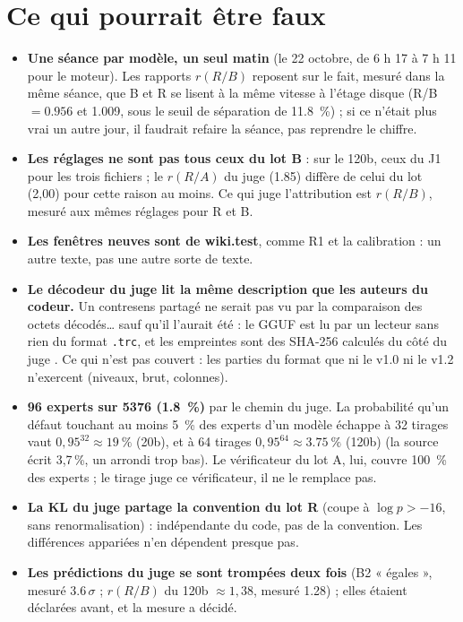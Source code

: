\section{Ce qui pourrait être faux}\label{t3jug:sec:faux}

\begin{faux}
\begin{itemize}
\item \textbf{Une séance par modèle, un seul matin} (le 22 octobre, de 6 h 17 à 7 h 11 pour le moteur). Les rapports $r(R/B)$ reposent sur le fait, mesuré dans la même séance, que B et R se lisent à la même vitesse à l'étage disque (R/B $= \num{0.956}$ et \num{1.009}, sous le seuil de séparation de \SI{11.8}{\percent}) ; si ce n'était plus vrai un autre jour, il faudrait refaire la séance, pas reprendre le chiffre.
\item \textbf{Les réglages ne sont pas tous ceux du lot B} : sur le 120b, ceux du J1 pour les trois fichiers ; le $r(R/A)$ du juge (\num{1.85}) diffère de celui du lot (2,00) pour cette raison au moins. Ce qui juge l'attribution est $r(R/B)$, mesuré aux mêmes réglages pour R et B.
\item \textbf{Les fenêtres neuves sont de wiki.test}, comme R1 et la calibration : un autre texte, pas une autre sorte de texte.
\item \textbf{Le décodeur du juge lit la même description que les auteurs du codeur.} Un contresens partagé ne serait pas vu par la comparaison des octets décodés… sauf qu'il l'aurait été : le GGUF est lu par un lecteur sans rien du format \texttt{.trc}, et les empreintes sont des SHA-256 calculés du côté du juge \parencite{fips180-4}. Ce qui n'est pas couvert : les parties du format que ni le v1.0 ni le v1.2 n'exercent (niveaux, brut, colonnes).
\item \textbf{96 experts sur \num{5376} (\SI{1.8}{\percent})} par le chemin du juge. La probabilité qu'un défaut touchant au moins \SI{5}{\percent} des experts d'un modèle échappe à 32 tirages vaut $0{,}95^{32} \approx \SI{19}{\percent}$ (20b), et à 64 tirages $0{,}95^{64} \approx \SI{3.75}{\percent}$ (120b) \calc{} (la source écrit 3,7\,\%, un arrondi trop bas). Le vérificateur du lot A, lui, couvre \SI{100}{\percent} des experts ; le tirage juge ce vérificateur, il ne le remplace pas.
\item \textbf{La KL du juge partage la convention du lot R} (coupe à $\log p > -16$, sans renormalisation) : indépendante du code, pas de la convention. Les différences appariées n'en dépendent presque pas.
\item \textbf{Les prédictions du juge se sont trompées deux fois} (B2 « égales », mesuré \num{3.6}\,$\sigma$ ; $r(R/B)$ du 120b $\approx 1{,}38$, mesuré \num{1.28}) ; elles étaient déclarées avant, et la mesure a décidé.

\end{itemize}
\end{faux}
